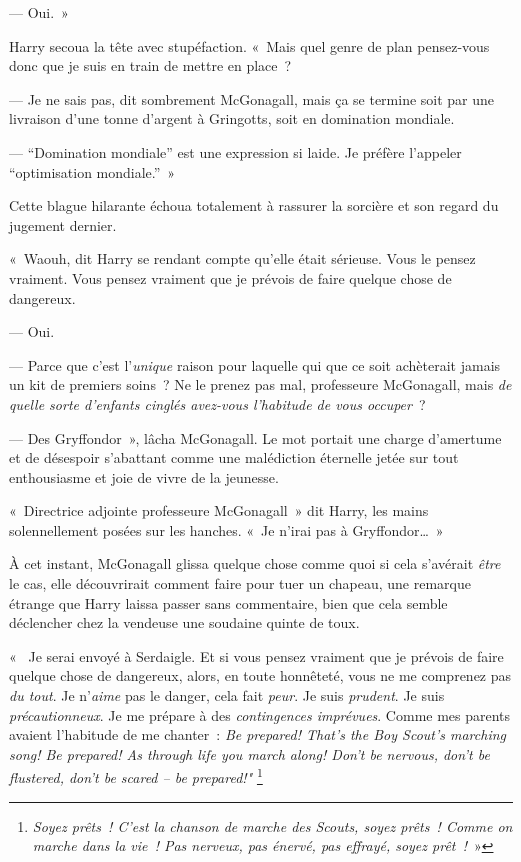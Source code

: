 --- Oui.~»

Harry secoua la tête avec stupéfaction. «~Mais quel genre de plan pensez-vous donc que je suis en train de mettre en place~?


--- Je ne sais pas, dit sombrement McGonagall, mais ça se termine soit par une livraison d'une tonne d'argent à Gringotts, soit en domination mondiale.

--- “Domination mondiale” est une expression si laide. Je préfère l'appeler “optimisation mondiale.”~»

Cette blague hilarante échoua totalement à rassurer la sorcière et son regard du jugement dernier.

«~Waouh, dit Harry se rendant compte qu'elle était sérieuse. Vous le pensez vraiment. Vous pensez vraiment que je prévois de faire quelque chose de dangereux.

--- Oui.

--- Parce que c'est l'\emph{unique} raison pour laquelle qui que ce soit achèterait jamais un kit de premiers soins~?
Ne le prenez pas mal, professeure McGonagall, mais \emph{de quelle sorte d'enfants cinglés avez-vous l'habitude de vous occuper}~?

--- Des Gryffondor~», lâcha McGonagall. Le mot portait une charge d'amertume et de désespoir s'abattant comme une malédiction éternelle jetée sur tout enthousiasme et joie de vivre de la jeunesse.

«~Directrice adjointe professeure McGonagall~» dit Harry, les mains solennellement posées sur les hanches. «~Je n'irai pas à Gryffondor…~»

À cet instant, McGonagall glissa quelque chose comme quoi si cela s'avérait \emph{être} le cas, elle découvrirait comment faire pour tuer un chapeau, une remarque étrange que Harry laissa passer sans commentaire, bien que cela semble déclencher chez la vendeuse une soudaine quinte de toux.

«~ Je serai envoyé à Serdaigle. Et si vous pensez vraiment que je prévois de faire quelque chose de dangereux, alors, en toute honnêteté, vous ne me comprenez pas \emph{du tout}.
Je n'\emph{aime} pas le danger, cela fait \emph{peur}.  Je suis \emph{prudent}.  Je suis \emph{précautionneux}. Je me prépare à des \emph{contingences imprévues}.
Comme mes parents avaient l'habitude de me chanter~:
\emph{Be prepared! That's the Boy Scout's marching song! Be prepared! As through life you march along! Don't be nervous, don't be flustered, don't be scared -- be prepared!"}
\footnote{\emph{Soyez prêts~! C'est la chanson de marche des Scouts, soyez prêts~! Comme on marche dans la vie~! Pas nerveux, pas énervé, pas effrayé, soyez prêt~!}~»}

